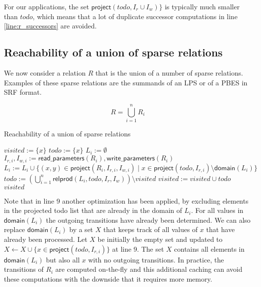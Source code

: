 \documentclass{article}
\newcommand{\var}[1]{\ensuremath{\textit{#1}}}
\begin{document}
\noindent
For our applications, the set $\textsf{project}(\var{todo}, I_r \cup I_w) \}$ is typically much smaller than $\var{todo}$, which means that a lot of duplicate successor computations in line \ref{line:r_successors} are avoided.

\newpage
\subsection{Reachability of a union of sparse relations}

We now consider a relation $R$ that is the union of a number of sparse relations. Examples of these sparse relations are the summands of an LPS or of a PBES in SRF format.

\[
R = \bigcup_{i=1}^{n} R_i
\]

\begin{algorithm}[h]
\caption{Reachability of a union of sparse relations}
\label{alg:reachability4}
\begin{algorithmic}[1]
\State $\var{visited} := \{ x \}$
\State $\var{todo} := \{ x \}$
    \State $L_i := \emptyset$
    \State $I_{r,i}, I_{w,i} := \textsf{read\_parameters}(R_i), \textsf{write\_parameters}(R_i)$
\EndFor
\While {$\var{todo} \neq \emptyset$}
        \State $L_i := L_i \cup \{ (x,y) \in \textsf{project}(R_i, I_{r,i}, I_{w,i}) \mid x \in \textsf{project}(\var{todo}, I_{r,i})  \setminus \textsf{domain}(L_i) \}$
    \EndFor
    \State $\var{todo} := \left( \bigcup\limits_{i=1}^n \textsf{relprod}(L_i, \var{todo}, I_r, I_w) \right) \setminus \var{visited}$
    \State $\var{visited} := \var{visited} \cup \var{todo}$
\EndWhile
\State \Return \var{visited}
\EndFunction
\end{algorithmic}
\end{algorithm}
\noindent
Note that in line 9 another optimization has been applied, by excluding elements in the projected todo list that are already in the domain of $L_i$.
For all values in $\textsf{domain}(L_i)$ the outgoing transitions have already been determined.
We can also replace $\textsf{domain}(L_i)$ by a set $X$ that keeps track of all values of $x$ that have already been processed.
Let $X$ be initially the empty set and updated to $X \gets X \cup \{x \in \textsf{project}(\var{todo}, I_{r,i})\}$ at line 9.
The set $X$ contains all elements in $\textsf{domain}(L_i)$ but also all $x$ with no outgoing transitions.
In practice, the transitions of $R_i$ are computed on-the-fly and this additional caching can avoid these computations with the downside that it requires more memory.
\end{document}
